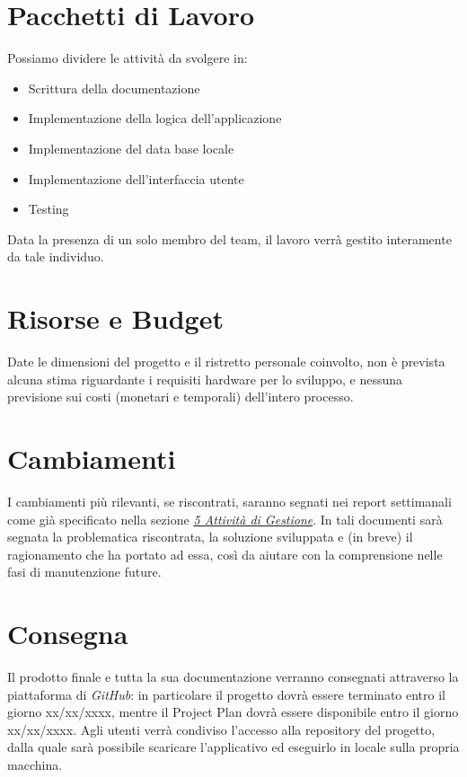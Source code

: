 \documentclass{article}
\begin{document}
\section{Pacchetti di Lavoro}
Possiamo dividere le attività da svolgere in:
\begin{itemize}
    \item Scrittura della documentazione
    \item Implementazione della logica dell'applicazione
    \item Implementazione del data base locale
    \item Implementazione dell'interfaccia utente
    \item Testing
\end{itemize}
Data la presenza di un solo membro del team, il lavoro verrà gestito interamente da tale individuo. 
\section{Risorse e Budget}
Date le dimensioni del progetto e il ristretto personale coinvolto, non è prevista alcuna stima riguardante i requisiti hardware per lo sviluppo, e nessuna previsione sui costi (monetari e temporali) dell'intero processo.   
\section{Cambiamenti}
I cambiamenti più rilevanti, se riscontrati, saranno segnati nei report settimanali come già specificato nella sezione \hyperref[sec:5]{\textit{5 Attività di Gestione}}. In tali documenti sarà segnata la problematica riscontrata, la soluzione sviluppata e (in breve) il ragionamento che ha portato ad essa, così da aiutare con la comprensione nelle fasi di manutenzione future. 
\section{Consegna}
Il prodotto finale e tutta la sua documentazione verranno consegnati attraverso la piattaforma di \textit{GitHub}: in particolare il progetto dovrà essere terminato entro il giorno xx/xx/xxxx, mentre il Project Plan dovrà essere disponibile entro il giorno xx/xx/xxxx. Agli utenti verrà condiviso l'accesso alla repository del progetto, dalla quale sarà possibile scaricare l'applicativo ed eseguirlo in locale sulla propria macchina. 
\end{document}
